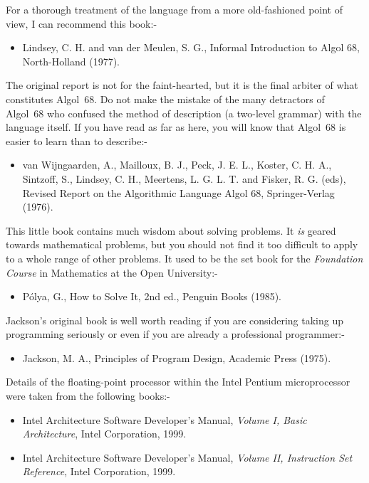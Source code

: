 For a thorough treatment of the language from a more old-fashioned point of
view, I can recommend this book:-
\begin{itemize}
\item{} Lindsey, C. H. and van der Meulen, S. G., Informal Introduction to
Algol 68, North-Holland (1977).
\end{itemize}
The original report is not for the faint-hearted, but it is the final arbiter
of what constitutes Algol~68. Do not make the mistake of the many detractors
of Algol~68 who confused the method of description (a two-level grammar) with the
language itself. If you have read as far as here, you will know that
Algol~68 is easier to learn than to describe:-
\begin{itemize}
\item{} van Wijngaarden, A., Mailloux, B. J., Peck, J. E. L., Koster, C. H.
A., Sintzoff, S., Lindsey, C. H., Meertens, L. G. L. T. and Fisker, R. G.
(eds), Revised Report on the Algorithmic Language Algol 68, Springer-Verlag
(1976).
\end{itemize}
This little book contains much wisdom about solving problems. It \emph{is}
geared towards mathematical problems, but you should not find it too difficult
to apply to a whole range of other problems. It used to be the set book for
the {\it Foundation Course\/} in Mathematics at the Open University:-
\begin{itemize}
\item{}P\'olya, G., How to Solve It, 2nd ed., Penguin Books (1985).
\end{itemize}
Jackson's original book is well worth reading if you are considering taking up
programming seriously or even if you are already a professional programmer:-
\begin{itemize}
\item{}Jackson, M. A., Principles of Program Design, Academic Press
(1975).
\end{itemize}
Details of the floating-point processor within the Intel Pentium
microprocessor were taken from the following books:-
\begin{itemize}
\item{}Intel Architecture Software Developer's Manual, \emph{Volume
I, Basic Architecture}, Intel Corporation, 1999.
\item{}Intel Architecture Software Developer's Manual, \emph{Volume
II, Instruction Set Reference}, Intel Corporation, 1999.
\end{itemize}
